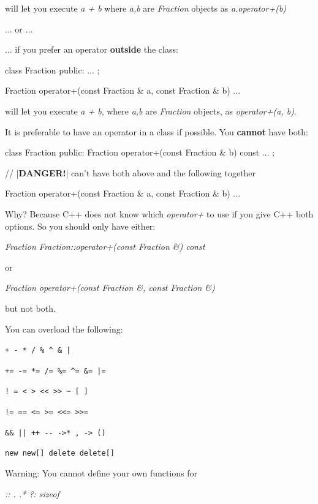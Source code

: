 will let you execute \textit{a + b} where \textit{a,b} are \textit{Fraction}
objects as \textit{a.operator+(b)}

... or ...

... if you prefer an operator \textbf{outside} the class:

\begin{consolethree}[escapeinside=||]
class Fraction
{
public:
    ...
};

Fraction operator+(const Fraction & a, const Fraction & b)
{
    ...
}
\end{consolethree}

will let you execute \textit{a + b}, where \textit{a,b} are \textit{Fraction}
objects, as \textit{operator+(a, b)}.

It is preferable to have an operator in a class if possible. You
\textbf{cannot} have both:

\begin{consolethree}[escapeinside=||]
class Fraction
{
public:
    Fraction operator+(const Fraction & b) const
    {
        ...
    }
};

// |{\bf DANGER!}| can't have both above and the following together

Fraction operator+(const Fraction & a, const Fraction & b)
{
    ...
}
\end{consolethree}

Why? Because C++ does not know which \textit{operator+} to use if you give
C++ both options. So you should only have either:

\textit{Fraction Fraction::operator+(const Fraction \&) const}

or

\textit{Fraction operator+(const Fraction \&, const Fraction \&)}

but not both.

You can overload the following:

\texttt{+ - * / \% \^{} \& |}

\texttt{+= -= *= /= \%= \^{}= \&= |=}

\texttt{! = < > << >> \~{} [ ]}

\texttt{!= == <= >= <<= >>=}

\texttt{\&\& || ++ -{}- ->* , -> ()}

\texttt{new new[] delete delete[]}

Warning: You cannot define your own functions for

\textit{:: . .* ?: sizeof}


\newpage{}

